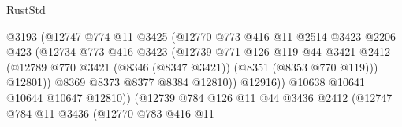 \begin{lexlean}{RustStd}
\begin{coremodule}
{\begin{coremodule}
{{{{{{{{{{{{{{{{{{{{{{{{{{{{{{{{{{{{{{{{{{{{{{{{{{                                      @3193
                                      (@12747
                                        @774
                                        @11
                                        @3425
                                        (@12770
                                          @773
                                          @416
                                          @11
                                          @2514
                                          @3423
                                          @2206
                                          @423
                                          (@12734
                                            @773
                                            @416
                                            @3423
                                            (@12739
                                              @771
                                              @126
                                              @119
                                              @44
                                              @3421
                                              @2412
                                              (@12789
                                                @770
                                                @3421
                                                (@8346 (@8347 @3421))
                                                (@8351 (@8353 @770 @119)))
                                              @12801))
                                          @8369
                                          @8373
                                          @8377
                                          @8384
                                          @12810))
                                      @12916))
                                  @10638
                                  @10641
                                  @10644
                                  @10647
                                  @12810))
                              (@12739
                                @784
                                @126
                                @11
                                @44
                                @3436
                                @2412
                                (@12747
                                  @784
                                  @11
                                  @3436
                                  (@12770
                                    @783
                                    @416
                                    @11
}}}}}}}}}}}}}}}}}}}}}}}}}}}}}}}}}}}}}}}}}}}}}}}}}}
\end{coremodule}}
\end{coremodule}
\end{lexlean}
